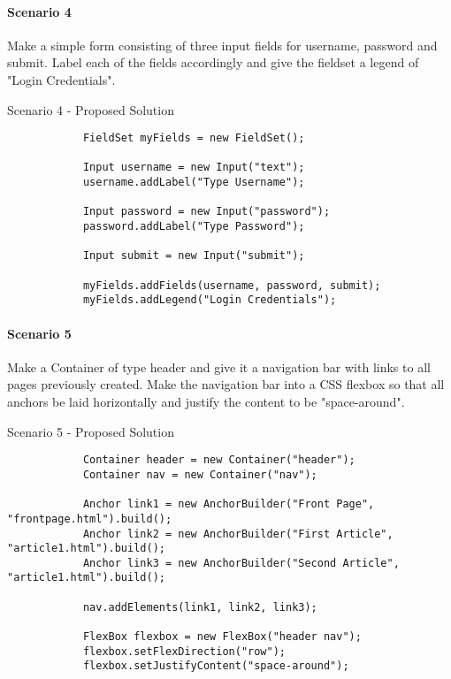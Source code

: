 \documentclass[12pt]{article}
\begin{document}
        \paragraph{Scenario 4}
        Make a simple form consisting of three input fields for username, password and submit. Label each of the fields accordingly and give the fieldset a legend of "Login Credentials".

        \begin{shaded}
            Scenario 4 - Proposed Solution
            \begin{lstlisting}
            FieldSet myFields = new FieldSet();

            Input username = new Input("text");
            username.addLabel("Type Username");
            
            Input password = new Input("password");
            password.addLabel("Type Password");
            
            Input submit = new Input("submit");

            myFields.addFields(username, password, submit);
            myFields.addLegend("Login Credentials");
            \end{lstlisting}
        \end{shaded}

        \paragraph{Scenario 5}
        Make a Container of type header and give it a navigation bar with links to all pages previously created. Make the navigation bar into a CSS flexbox so that all anchors be laid horizontally and justify the content to be "space-around".
        
        \begin{shaded}
            Scenario 5 - Proposed Solution
            \begin{lstlisting}
            Container header = new Container("header");
            Container nav = new Container("nav");

            Anchor link1 = new AnchorBuilder("Front Page", "frontpage.html").build();
            Anchor link2 = new AnchorBuilder("First Article", "article1.html").build();
            Anchor link3 = new AnchorBuilder("Second Article", "article1.html").build();

            nav.addElements(link1, link2, link3);

            FlexBox flexbox = new FlexBox("header nav");
            flexbox.setFlexDirection("row");
            flexbox.setJustifyContent("space-around");
            \end{lstlisting}
        \end{shaded}
\end{document}
